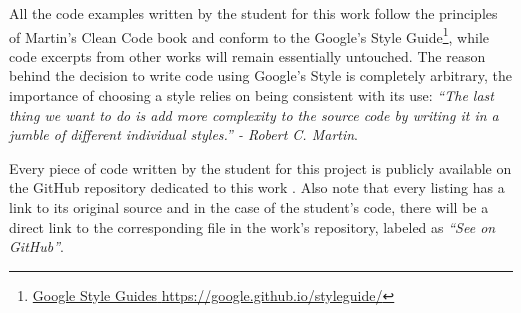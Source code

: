 All the code examples written by the student for this work follow the principles of Martin's Clean Code book \cite{Martin:2009:Clean} and conform to the Google's Style Guide\footnote{\href{https://google.github.io/styleguide/}{{Google Style Guides} \url{https://google.github.io/styleguide/}}}, while code excerpts from other works will remain essentially untouched.
The reason behind the decision to write code using Google's Style is completely arbitrary, the importance of choosing a style relies on being consistent with its use: \textit{``The last thing we want to do is add more complexity to the source code by writing it in a jumble of different individual styles.'' - Robert C. Martin}.

Every piece of code written by the student for this project is publicly available on the GitHub repository dedicated to this work \cite{URL::TFG}.
Also note that every listing has a link to its original source and in the case of the student's code, there will be a direct link to the corresponding file in the work's repository, labeled as \textit{``See on GitHub''}.

